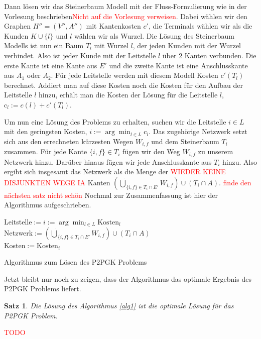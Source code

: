 \documentclass[11pt,a4paper]{article}
\makeatletter
\newcommand{\TODO}{\textcolor{red}{TODO}}
\theoremstyle{my_th_style1}
\newtheorem{satz}{Satz}
\renewenvironment{proof}[1][\proofname]{\par 
	\pushQED{\qed}%
	\normalfont \topsep6\p@\@plus6\p@\relax 
	\trivlist 
	\item[\hskip\labelsep 
	\bfseries 
	#1\@addpunct{:}]\ignorespaces 
}{%
\popQED\endtrivlist\@endpefalse 
}
\makeatother
\begin{document}
Dann lösen wir das Steinerbaum Modell mit der Fluss-Formulierung wie in der Vorlesung beschrieben\textcolor{red}{Nicht auf die Vorlesung verweisen}. Dabei wählen wir den Graphen $H''=(V'',A'')$ mit Kantenkosten $c'$, die Terminals wählen wir als die Kunden $K \cup \{l\}$ und $l$ w\"ahlen wir als Wurzel. Die Lösung des Steinerbaum Modells ist nun ein Baum $T_l$ mit Wurzel $l$, der jeden Kunden mit der Wurzel verbindet. Also ist jeder Kunde mit der Leitstelle $l$ über 2 Kanten verbunden. Die erste Kante ist eine Kante aus $E'$ und die zweite Kante ist eine Anschlusskante aus $A_1$ oder $A_2$. Für jede Leitstelle werden mit diesem Modell Kosten $c'(T_l)$ berechnet. Addiert man auf diese Kosten noch die Kosten für den Aufbau der Leitstelle $l$ hinzu, erhält man die Kosten der Lösung für die Leitstelle \(l\), $\text{c}_l:=c(l)+c'(T_l)$.

Um nun eine Lösung des Problems zu erhalten, suchen wir die Leitstelle $i \in L$ mit den geringsten Kosten, $i:=\arg \displaystyle\min_{l \in L} \text{c}_l$. Das zugehörige Netzwerk setzt sich aus den errechneten kürzesten Wegen  $W_{i,f}$ und dem Steinerbaum $T_i$ zusammen. Für jede Kante $\{i,f\} \in T_i$ fügen wir den Weg $W_{i,f}$ zu unserem Netzwerk hinzu. Darüber hinaus fügen wir jede Anschlusskante aus $T_i$ hinzu. Also ergibt sich insgesamt das Netzwerk als die Menge der \textcolor{red}{WIEDER KEINE DISJUNKTEN WEGE IA} Kanten $(\dot{\bigcup}_{\{i,f\} \in T_i \cap E'}W_{i,f}) \cup (T_i\cap A)$.
\textcolor{red}{finde den n\"achsten satz nicht sch\"on}
Nochmal zur Zusammenfassung ist hier der Algorithmus aufgeschrieben.

\vspace{0.5cm}
\begin{algorithm}[H]
	\label{alg1}
\BlankLine

	Leitstelle$:=i:=\arg \displaystyle\min_{l \in L} \text{Kosten}_l$\\
	Netzwerk$:=(\dot{\bigcup}_{\{i,f\} \in T_i \cap E'}W_{i,f}) \cup (T_i\cap A)$\\
	Kosten$:=\text{Kosten}_{i}$
	\BlankLine
\caption{Algorithmus zum Lösen des P2PGK Problems}
\end{algorithm}
\vspace{0.5cm}
Jetzt bleibt nur noch zu zeigen, dass der Algorithmus das optimale Ergebnis des P2PGK Problems liefert.
\begin{satz}
	Die Lösung des Algorithmus \ref{alg1} ist die optimale Lösung für das P2PGK Problem.
\end{satz}
\begin{proof}
	\TODO
\end{proof}
\end{document}
